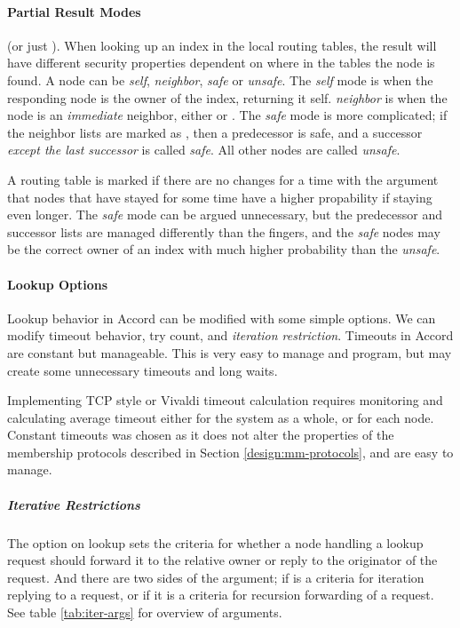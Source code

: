 \paragraph{Partial Result Modes}
 (or just ).
When looking up an index in the local routing tables, the result will have different
 security properties dependent on where in the tables the node is found. A node can
 be \emph{self}, \emph{neighbor}, \emph{safe} or \emph{unsafe}. The
 \emph{self} mode is when the responding node is the owner of the index, returning
 it self. \emph{neighbor} is when the node is an \emph{immediate} neighbor, either
  or . The \emph{safe} mode is more complicated;
 if the neighbor lists are marked as , then a predecessor is safe, and a successor
 \emph{except the last successor} is called \emph{safe}. All other nodes are called
 \emph{unsafe}.

A routing table is marked  if there are no changes for a time with the argument
 that nodes that have stayed for some time have a higher propability if staying even
 longer\cite{maymounkov-02-kademlia}.
 The \emph{safe} mode can be argued unnecessary, but the predecessor and successor
 lists are managed differently than the fingers, and the \emph{safe} nodes may be
 the correct owner of an index with much higher probability than the \emph{unsafe}.

\paragraph{Lookup Options}

Lookup behavior in Accord can be modified with some simple options. We can modify
 timeout behavior, try count, and \emph{iteration restriction}. Timeouts in Accord
 are constant but manageable. This is very easy to manage and program, but may
 create some unnecessary timeouts and long waits.

Implementing TCP style or Vivaldi timeout calculation requires monitoring and
 calculating average timeout either for the system as a whole, or for each node.
Constant timeouts was chosen as it does not alter the
 properties of the membership protocols described in Section \ref{design:mm-protocols},
 and are easy to manage.


\subparagraph{Iterative Restrictions}
The  option on lookup sets the criteria for whether a node handling a
 lookup request should forward it to the relative owner or reply to the originator of
 the request.
 And there are two sides of the  argument; if  is a
 criteria for iteration {replying to a request}, or if it is a criteria for recursion
 {forwarding of a request}. See table \ref{tab:iter-args} for overview of arguments.

